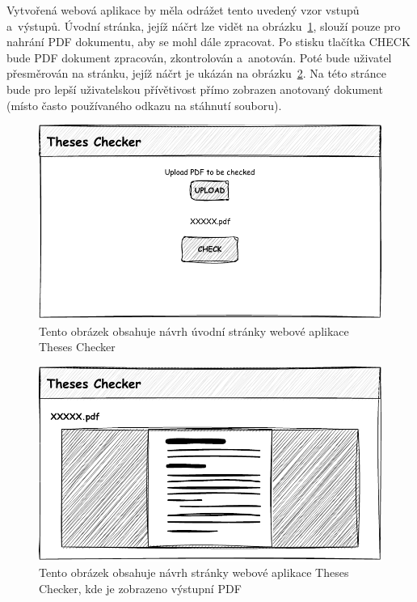 Vytvořená webová aplikace by měla odrážet tento uvedený vzor vstupů a~výstupů.
Úvodní stránka, jejíž náčrt lze vidět na
obrázku~\ref{pic_theses_checker_design_page1}, slouží pouze pro nahrání
PDF dokumentu, aby se mohl dále zpracovat. Po stisku tlačítka CHECK bude
PDF dokument zpracován, zkontrolován a~anotován. Poté bude uživatel přesměrován na
stránku, jejíž náčrt je ukázán na obrázku~\ref{pic_theses_checker_design_page2}.
Na této stránce bude pro lepší uživatelskou přívětivost přímo zobrazen
anotovaný dokument (místo často používaného odkazu na stáhnutí souboru).

\begin{figure}[H]
    \centering
    \includegraphics[width=0.8\linewidth]{obrazky-figures/Theses_Checker_design-page1.pdf}
    \caption{
        Tento obrázek obsahuje návrh úvodní stránky webové aplikace Theses Checker
    }
    \label{pic_theses_checker_design_page1}
\end{figure}

\begin{figure}[H]
    \centering
    \includegraphics[width=0.8\linewidth]{obrazky-figures/Theses_Checker_design-page2.pdf}
    \caption{
        Tento obrázek obsahuje návrh stránky webové aplikace Theses Checker, kde
        je zobrazeno výstupní PDF
    }
    \label{pic_theses_checker_design_page2}
\end{figure}

